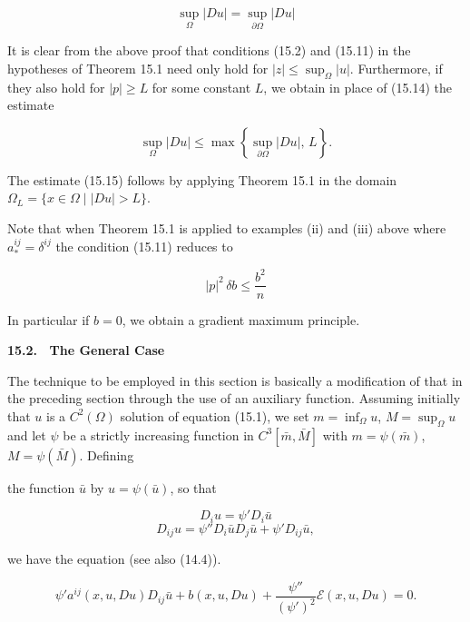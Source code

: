 \begin{equation}
\tag{15.14}
\sup_{\Omega} |Du| = \sup_{\partial\Omega} |Du|
\end{equation}

\noindent It is clear from the above proof that conditions (15.2) and (15.11) in the
hypotheses of Theorem 15.1 need only hold for $|z| \leq \sup_\Omega |u|$. Furthermore, if they
also hold for $|p| \geq L$ for some constant $L$, we obtain in place of (15.14) the estimate

\begin{equation}
\tag{15.15}
\sup_{\Omega} |Du| \leq \max \left\{ \sup_{\partial\Omega} |Du|,\, L \right\}.
\end{equation}

\noindent The estimate (15.15) follows by applying Theorem 15.1 in the domain $\Omega_L =
\{x \in \Omega \mid |Du| > L\}$.

\noindent Note that when Theorem 15.1 is applied to examples (ii) and (iii) above where
$a_*^{ij} = \delta^{ij}$ the condition (15.11) reduces to

\begin{equation}
\tag{15.16}
|p|^2\,\delta b \leq \frac{b^2}{n}
\end{equation}

\noindent In particular if $b=0$, we obtain a gradient maximum principle.

\bigskip

\noindent\textbf{15.2. \ The General Case}

\medskip

The technique to be employed in this section is basically a modification of that in
the preceding section through the use of an auxiliary function. Assuming initially
that $u$ is a $C^2(\Omega)$ solution of equation (15.1), we set $m=\inf_\Omega u$, $M=\sup_\Omega u$ and let $\psi$
be a strictly increasing function in $C^3[\bar m, \bar M]$ with $m=\psi(\bar m)$, $M=\psi(\bar M)$. Defining




the function $\bar u$ by $u=\psi(\bar u)$, so that

\[
D_i u=\psi' D_i \bar u
\]
\[
D_{ij}u=\psi'' D_i \bar u D_j \bar u+\psi' D_{ij}\bar u,
\]

we have the equation (see also (14.4)).

\begin{equation}
\psi' a^{ij}(x,u,Du)D_{ij}\bar u+b(x,u,Du)+\frac{\psi''}{(\psi')^2}\mathcal E(x,u,Du)=0.
\tag{15.17}
\end{equation}

